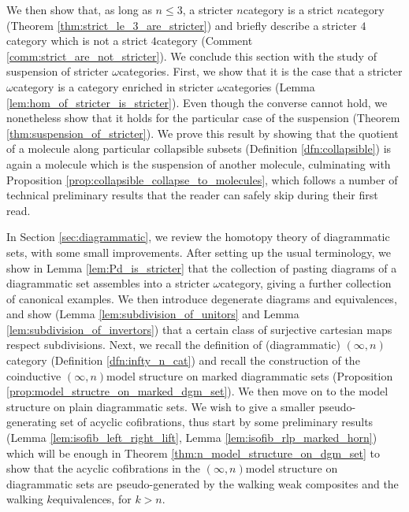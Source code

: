We then show that, as long as \( n \le 3 \), a stricter \( n \)\nbd category is a strict \( n \)\nbd category (Theorem \ref{thm:strict_le_3_are_stricter}) and briefly describe a stricter \( 4 \)\nbd category which is not a strict \( 4 \)\nbd category (Comment \ref{comm:strict_are_not_stricter}).
We conclude this section with the study of suspension of stricter \( \omega \)\nbd categories.
First, we show that it is the case that a stricter \( \omega \)\nbd category is a category enriched in stricter \( \omega \)\nbd categories (Lemma \ref{lem:hom_of_stricter_is_stricter}).
Even though the converse cannot hold, we nonetheless show that it holds for the particular case of the suspension (Theorem \ref{thm:suspension_of_stricter}).
We prove this result by showing that the quotient of a molecule along particular collapsible subsets (Definition \ref{dfn:collapsible}) is again a molecule which is the suspension of another molecule, culminating with Proposition \ref{prop:collapsible_collapse_to_molecules}, which follows a number of technical preliminary results that the reader can safely skip during their first read.

In Section \ref{sec:diagrammatic}, we review the homotopy theory of diagrammatic sets, with some small improvements. 
After setting up the usual terminology, we show in Lemma \ref{lem:Pd_is_stricter} that the collection of pasting diagrams of a diagrammatic set assembles into a stricter \( \omega \)\nbd category, giving a further collection of canonical examples.
We then introduce degenerate diagrams and equivalences, and show (Lemma \ref{lem:subdivision_of_unitors} and Lemma \ref{lem:subdivision_of_invertors}) that a certain class of surjective cartesian maps respect subdivisions.
Next, we recall the definition of (diagrammatic) \( (\infty, n) \)\nbd category (Definition \ref{dfn:infty_n_cat}) and recall the construction of the coinductive \( (\infty, n) \)\nbd model structure on marked diagrammatic sets (Proposition \ref{prop:model_structre_on_marked_dgm_set}).
We then move on to the model structure on plain diagrammatic sets. 
We wish to give a smaller pseudo-generating set of acyclic cofibrations, thus start by some preliminary results (Lemma \ref{lem:isofib_left_right_lift}, Lemma \ref{lem:isofib_rlp_marked_horn}) which will be enough in Theorem \ref{thm:n_model_structure_on_dgm_set} to show that the acyclic cofibrations in the \( (\infty, n) \)\nbd model structure on diagrammatic sets are pseudo-generated by the walking weak composites and the walking \( k \)\nbd equivalences, for \( k > n \). 

